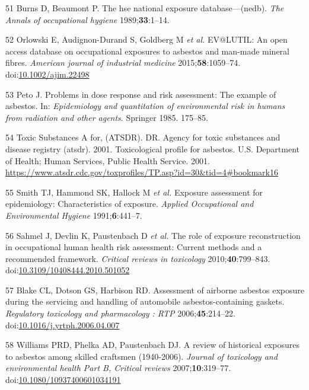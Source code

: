 \documentclass[12pt,a4paper,]{report}
\begin{document}
\leavevmode\hypertarget{ref-Burns1989}{}%
51 Burns D, Beaumont P. The hse national exposure database---(nedb).
\emph{The Annals of occupational hygiene} 1989;\textbf{33}:1--14.

\leavevmode\hypertarget{ref-Orlowski2015}{}%
52 Orlowski E, Audignon-Durand S, Goldberg M \emph{et al.} EV@LUTIL: An
open access database on occupational exposures to asbestos and man-made
mineral fibres. \emph{American journal of industrial medicine}
2015;\textbf{58}:1059--74.
doi:\href{https://doi.org/10.1002/ajim.22498}{10.1002/ajim.22498}

\leavevmode\hypertarget{ref-Peto1985}{}%
53 Peto J. Problems in dose response and risk assessment: The example of
asbestos. In: \emph{Epidemiology and quantitation of environmental risk
in humans from radiation and other agents}. Springer 1985. 175--85.

\leavevmode\hypertarget{ref-ATSDR2001}{}%
54 Toxic Substances A for, (ATSDR). DR. Agency for toxic substances and
disease registry (atsdr). 2001. Toxicological profile for asbestos. U.S.
Department of Health; Human Services, Public Health Service. 2001.
\url{https://www.atsdr.cdc.gov/toxprofiles/TP.asp?id=30\&tid=4\#bookmark16}

\leavevmode\hypertarget{ref-Smith1991}{}%
55 Smith TJ, Hammond SK, Hallock M \emph{et al.} Exposure assessment for
epidemiology: Characteristics of exposure. \emph{Applied Occupational
and Environmental Hygiene} 1991;\textbf{6}:441--7.

\leavevmode\hypertarget{ref-Sahmel2010}{}%
56 Sahmel J, Devlin K, Paustenbach D \emph{et al.} The role of exposure
reconstruction in occupational human health risk assessment: Current
methods and a recommended framework. \emph{Critical reviews in
toxicology} 2010;\textbf{40}:799--843.
doi:\href{https://doi.org/10.3109/10408444.2010.501052}{10.3109/10408444.2010.501052}

\leavevmode\hypertarget{ref-Blake2006}{}%
57 Blake CL, Dotson GS, Harbison RD. Assessment of airborne asbestos
exposure during the servicing and handling of automobile
asbestos-containing gaskets. \emph{Regulatory toxicology and
pharmacology : RTP} 2006;\textbf{45}:214--22.
doi:\href{https://doi.org/10.1016/j.yrtph.2006.04.007}{10.1016/j.yrtph.2006.04.007}

\leavevmode\hypertarget{ref-Williams2007}{}%
58 Williams PRD, Phelka AD, Paustenbach DJ. A review of historical
exposures to asbestos among skilled craftsmen (1940-2006). \emph{Journal
of toxicology and environmental health Part B, Critical reviews}
2007;\textbf{10}:319--77.
doi:\href{https://doi.org/10.1080/10937400601034191}{10.1080/10937400601034191}
\end{document}
